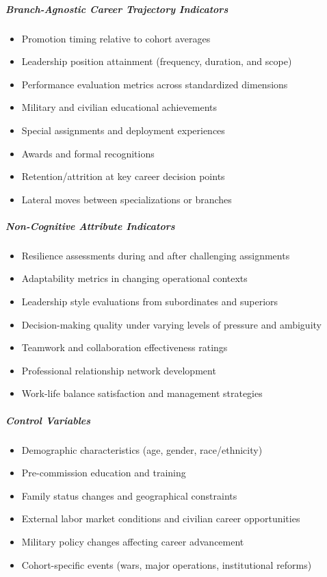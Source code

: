 \documentclass[../main.tex]{subfiles}
\begin{document}
\subparagraph{Branch-Agnostic Career Trajectory Indicators}
\begin{itemize}
\item Promotion timing relative to cohort averages
\item Leadership position attainment (frequency, duration, and scope)
\item Performance evaluation metrics across standardized dimensions
\item Military and civilian educational achievements
\item Special assignments and deployment experiences
\item Awards and formal recognitions
\item Retention/attrition at key career decision points
\item Lateral moves between specializations or branches
\end{itemize}

\subparagraph{Non-Cognitive Attribute Indicators}
\begin{itemize}
\item Resilience assessments during and after challenging assignments
\item Adaptability metrics in changing operational contexts
\item Leadership style evaluations from subordinates and superiors
\item Decision-making quality under varying levels of pressure and ambiguity
\item Teamwork and collaboration effectiveness ratings
\item Professional relationship network development
\item Work-life balance satisfaction and management strategies
\end{itemize}

\subparagraph{Control Variables}
\begin{itemize}
\item Demographic characteristics (age, gender, race/ethnicity)
\item Pre-commission education and training
\item Family status changes and geographical constraints
\item External labor market conditions and civilian career opportunities
\item Military policy changes affecting career advancement
\item Cohort-specific events (wars, major operations, institutional reforms)
\end{itemize}
\end{document}
